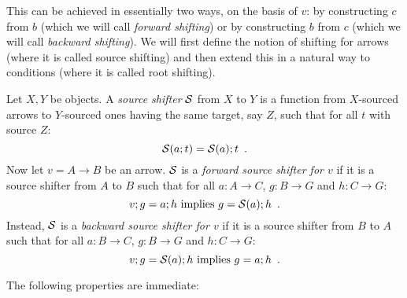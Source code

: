 This can be achieved in essentially two ways, on the basis of $v$: by constructing $c$ from $b$ (which we will call \emph{forward shifting}) or by constructing $b$ from $c$ (which we will call \emph{backward shifting}).
%
We will first define the notion of shifting for arrows (where it is called source shifting) and then extend this in a natural way to conditions (where it is called root shifting).
%
\begin{definition}
Let $X,Y$ be objects. A \emph{source shifter} $\mathcal{S}$ from $X$ to $Y$ is a function from $X$-sourced arrows to $Y$-sourced ones having the same target, say $Z$, such that for all $t$ with source $Z$:
%
\begin{equation}\eqlabel{shifters are functors}
\cS(a;t) = \cS(a);t \enspace.
\end{equation}
%
Now let $v=A\to B$ be an arrow. $\mathcal{S}$ is a \emph{forward source shifter for $v$} if it  is a source shifter from $A$ to $B$ such that for all $a:A\to C$, $g:B\to G$ and $h:C\to G$:
%
\begin{equation}\eqlabel{forward condition}
v;g = a;h \text{ implies } g = \cS(a);h \enspace.
\end{equation}
%
Instead, $\mathcal{S}$ is a \emph{backward source shifter for $v$} if it is a source shifter from $B$ to $A$ such that for all $a:B\to C$, $g:B\to G$ and $h:C\to G$:
%
\begin{equation}\eqlabel{backward condition}
v;g = \cS(a);h \text{ implies } g = a;h \enspace.
\end{equation}
%
\end{definition}
%
The following properties are immediate:
%

